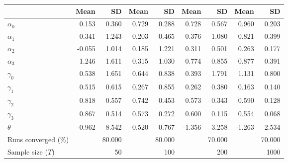 
\begin{tabular}[t]{lrrrrrrrr}
\toprule
  & Mean & SD & Mean  & SD  & Mean   & SD   & Mean    & SD   \\
\midrule
$\alpha_{0}$ & 0.153 & 0.360 & 0.729 & 0.288 & 0.728 & 0.567 & 0.960 & 0.203\\
$\alpha_{1}$ & 0.341 & 1.243 & 0.203 & 0.465 & 0.376 & 1.080 & 0.821 & 0.399\\
$\alpha_{2}$ & -0.055 & 1.014 & 0.185 & 1.221 & 0.311 & 0.501 & 0.263 & 0.177\\
$\alpha_{3}$ & 1.246 & 1.611 & 0.315 & 1.030 & 0.774 & 0.855 & 0.877 & 0.391\\
$\gamma_{0}$ & 0.538 & 1.651 & 0.644 & 0.838 & 0.393 & 1.791 & 1.131 & 0.800\\
$\gamma_{1}$ & 0.515 & 0.615 & 0.267 & 0.855 & 0.262 & 0.380 & 0.163 & 0.140\\
$\gamma_{2}$ & 0.818 & 0.557 & 0.742 & 0.453 & 0.573 & 0.343 & 0.590 & 0.128\\
$\gamma_{3}$ & 0.867 & 0.514 & 0.573 & 0.272 & 0.600 & 0.115 & 0.554 & 0.068\\
$\theta$ & -0.962 & 8.542 & -0.520 & 0.767 & -1.356 & 3.258 & -1.263 & 2.534\\
Runs converged (\%) &  & 80.000 &  & 80.000 &  & 70.000 &  & 70.000\\
Sample size ($T$) &  & 50 &  & 100 &  & 200 &  & 1000\\
\bottomrule
\end{tabular}
